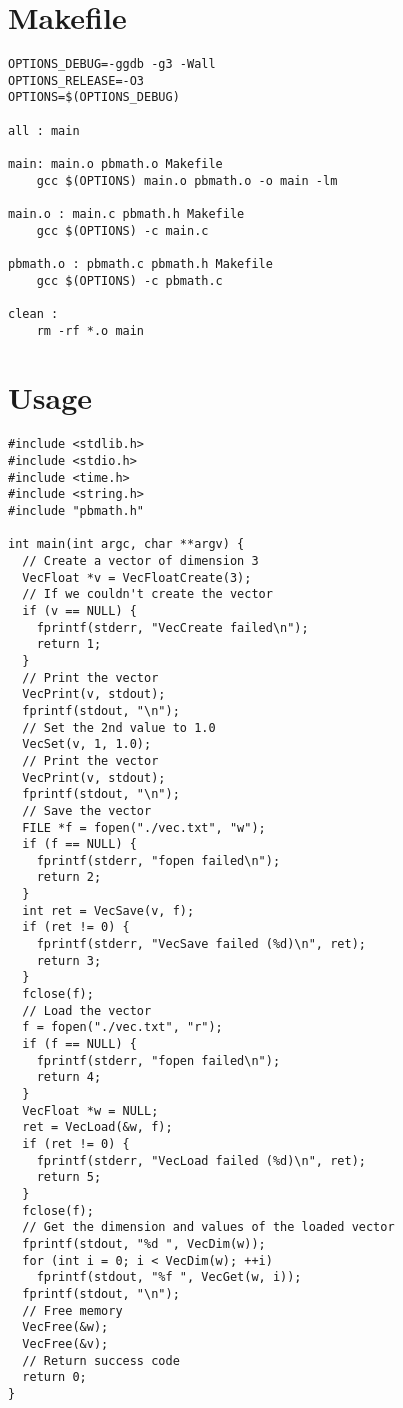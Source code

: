 \documentclass[12pt, a4paper]{article}
\begin{document}
\section{Makefile}

\begin{scriptsize}
\begin{ttfamily}
\begin{lstlisting}
OPTIONS_DEBUG=-ggdb -g3 -Wall
OPTIONS_RELEASE=-O3 
OPTIONS=$(OPTIONS_DEBUG)

all : main

main: main.o pbmath.o Makefile 
	gcc $(OPTIONS) main.o pbmath.o -o main -lm

main.o : main.c pbmath.h Makefile
	gcc $(OPTIONS) -c main.c

pbmath.o : pbmath.c pbmath.h Makefile
	gcc $(OPTIONS) -c pbmath.c

clean : 
	rm -rf *.o main
\end{lstlisting}
\end{ttfamily}
\end{scriptsize}

\section{Usage}

\begin{scriptsize}
\begin{ttfamily}
\begin{lstlisting}
#include <stdlib.h>
#include <stdio.h>
#include <time.h>
#include <string.h>
#include "pbmath.h"

int main(int argc, char **argv) {
  // Create a vector of dimension 3
  VecFloat *v = VecFloatCreate(3);
  // If we couldn't create the vector
  if (v == NULL) {
    fprintf(stderr, "VecCreate failed\n");
    return 1;
  }
  // Print the vector
  VecPrint(v, stdout);
  fprintf(stdout, "\n");
  // Set the 2nd value to 1.0
  VecSet(v, 1, 1.0);
  // Print the vector
  VecPrint(v, stdout);
  fprintf(stdout, "\n");
  // Save the vector
  FILE *f = fopen("./vec.txt", "w");
  if (f == NULL) {
    fprintf(stderr, "fopen failed\n");
    return 2;
  }
  int ret = VecSave(v, f);
  if (ret != 0) {
    fprintf(stderr, "VecSave failed (%d)\n", ret);
    return 3;
  }
  fclose(f);
  // Load the vector
  f = fopen("./vec.txt", "r");
  if (f == NULL) {
    fprintf(stderr, "fopen failed\n");
    return 4;
  }
  VecFloat *w = NULL;
  ret = VecLoad(&w, f);
  if (ret != 0) {
    fprintf(stderr, "VecLoad failed (%d)\n", ret);
    return 5;
  }
  fclose(f);
  // Get the dimension and values of the loaded vector
  fprintf(stdout, "%d ", VecDim(w));
  for (int i = 0; i < VecDim(w); ++i)
    fprintf(stdout, "%f ", VecGet(w, i));
  fprintf(stdout, "\n");
  // Free memory
  VecFree(&w);
  VecFree(&v);
  // Return success code
  return 0;
}
\end{lstlisting}
\end{ttfamily}
\end{scriptsize}
\end{document}
